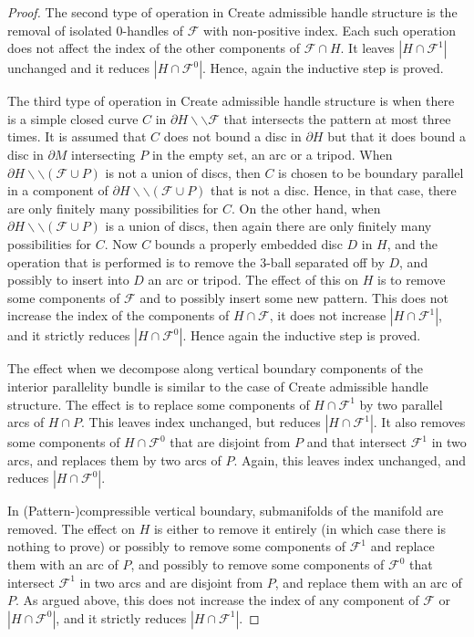 \documentclass[oneside]{amsart}
\numberwithin{equation}{section}
\theoremstyle{plain}
\theoremstyle{definition}
\newcommand{\cut}{\backslash\backslash}
\newcommand{\calF}{\mathcal{F}}
\begin{document}
\begin{proof}
The second type of operation in {\sc Create admissible handle structure} is the removal of isolated 0-handles of $\mathcal{F}$ with non-positive index. Each such operation does not affect the index of the other components of $\mathcal{F} \cap H$. It leaves $|H \cap \mathcal{F}^1|$ unchanged and it reduces $|H \cap \mathcal{F}^0|$. Hence, again the inductive step is proved.

The third type of operation in {\sc Create admissible handle structure} is when there is a simple closed curve $C$ in $\partial H \cut \calF$ that intersects the pattern at most three times. It is assumed that $C$ does not bound a disc in $\partial H$ but that it does bound a disc in $\partial M$ intersecting $P$ in the empty set, an arc or a tripod. When $\partial H \cut (\calF \cup P)$ is not a union of discs, then $C$ is chosen to be boundary parallel in a component of $\partial H \cut (\calF \cup P)$ that is not a disc. Hence, in that case, there are only finitely many possibilities for $C$. On the other hand, when $\partial H \cut (\calF \cup P)$ is a union of discs, then again there are only finitely many possibilities for $C$. Now $C$ bounds a properly embedded disc $D$ in $H$, and the operation that is performed is to remove the 3-ball separated off by $D$, and possibly to insert into $D$ an arc or tripod. The effect of this on $H$ is to remove some components of $\calF$ and to possibly insert some new pattern. This does not increase the index of the components of $H \cap \calF$, it does not increase $|H \cap \calF^1|$, and it strictly reduces $|H \cap \calF^0|$. Hence again the inductive step is proved.

The effect when we decompose along vertical boundary components of the interior parallelity bundle is similar to the case of {\sc Create admissible handle structure}. The effect is to replace some components of $H \cap \mathcal{F}^1$ by two parallel arcs of $H \cap P$. This leaves index unchanged, but reduces $|H \cap \mathcal{F}^1|$. It also removes some components of $H \cap \mathcal{F}^0$ that are disjoint from $P$ and that intersect $\mathcal{F}^1$ in two arcs, and replaces them by two arcs of $P$. Again, this leaves index unchanged, and reduces $|H \cap \mathcal{F}^0|$.

In {\sc (Pattern-)compressible vertical boundary}, submanifolds of the manifold are removed. The effect on $H$ is either to remove it entirely (in which case there is nothing to prove) or possibly to remove some components of $\mathcal{F}^1$ and replace them with an arc of $P$, and possibly to remove some components of $\mathcal{F}^0$ that intersect $\mathcal{F}^1$ in two arcs and are disjoint from $P$, and replace them with an arc of $P$. As argued above, this does not increase the index of any component of $\mathcal{F}$ or  $|H \cap \mathcal{F}^0|$, and it strictly reduces $|H \cap \mathcal{F}^1|$.


\end{proof}
\end{document}
